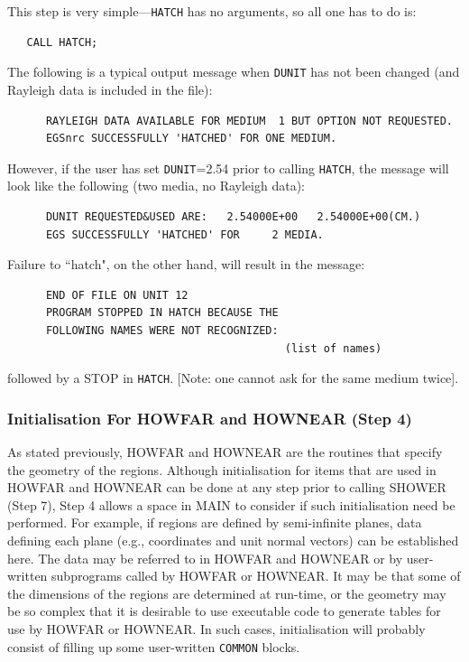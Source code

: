This step is very simple---{\tt HATCH} has no arguments, so all one has to do
is:
\begin{verbatim}
   CALL HATCH;
\end{verbatim}

The following is a typical output message when {\tt DUNIT} has not been changed
(and Rayleigh data is included in the file):
\begin{verbatim}
      RAYLEIGH DATA AVAILABLE FOR MEDIUM  1 BUT OPTION NOT REQUESTED.
      EGSnrc SUCCESSFULLY 'HATCHED' FOR ONE MEDIUM.
\end{verbatim}
However, if the user has set {\tt DUNIT}=2.54 prior to calling {\tt HATCH}, the message
will look like the following (two media, no Rayleigh data):
\begin{verbatim}
      DUNIT REQUESTED&USED ARE:   2.54000E+00   2.54000E+00(CM.)
      EGS SUCCESSFULLY 'HATCHED' FOR     2 MEDIA.
\end{verbatim}
Failure to ``hatch", on the other hand, will result in the message:
\begin{verbatim}
      END OF FILE ON UNIT 12
      PROGRAM STOPPED IN HATCH BECAUSE THE
      FOLLOWING NAMES WERE NOT RECOGNIZED:
                                           (list of names)
\end{verbatim}
followed by a STOP in {\tt HATCH}.  [Note: one cannot ask for the same medium twice].


\subsubsection{Initialisation For HOWFAR and HOWNEAR (Step 4)}
\label{step_4}


As stated previously, HOWFAR and HOWNEAR are the routines that specify
the geometry of
the regions.  Although initialisation for items that are used in
HOWFAR and HOWNEAR
can be done at any step prior to calling SHOWER (Step 7), Step 4 allows a
space in MAIN to consider if such initialisation need be performed.  For
example, if regions are defined by semi-infinite planes, data defining each
plane (e.g., coordinates and unit normal vectors) can be established here.
The data may be referred to in HOWFAR and HOWNEAR
or by user-written subprograms called
by HOWFAR or HOWNEAR.  It may be that some of the dimensions of the regions are
determined at run-time, or the geometry may be so complex that it is
desirable to use executable code to generate tables for use by HOWFAR or
HOWNEAR.  In
such cases, initialisation  will probably consist of filling up
some user-written {\tt COMMON} blocks.


